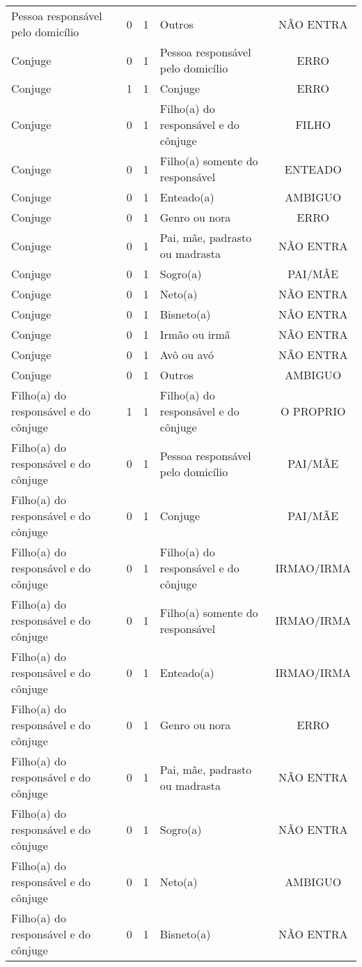 \documentclass[
	12pt,				%
	openright,			%
	twoside,			%
	a4paper,			%
	english,			%
	french,				%
	spanish,			%
	brazil				%
	]{abntex2}
\begin{document}
\begin{anexosenv}
\begin{longtable}{@{}lcclc@{}}
				Pessoa responsável pelo domicílio & 0 & 1 & Outros & NÃO ENTRA \\
				Conjuge & 0 & 1 & Pessoa responsável pelo domicílio & ERRO \\
				Conjuge & 1 & 1 & Conjuge & ERRO \\
				Conjuge & 0 & 1 & Filho(a) do responsável e do cônjuge & FILHO \\
				Conjuge & 0 & 1 & Filho(a) somente do responsável & ENTEADO \\
				Conjuge & 0 & 1 & Enteado(a) & AMBIGUO \\
				Conjuge & 0 & 1 & Genro ou nora & ERRO \\
				Conjuge & 0 & 1 & Pai, mãe, padrasto ou madrasta & NÃO ENTRA \\
				Conjuge & 0 & 1 & Sogro(a) & PAI/MÃE \\
				Conjuge & 0 & 1 & Neto(a) & NÃO ENTRA \\
				Conjuge & 0 & 1 & Bisneto(a) & NÃO ENTRA \\
				Conjuge & 0 & 1 & Irmão ou irmã & NÃO ENTRA \\
				Conjuge & 0 & 1 & Avô ou avó & NÃO ENTRA \\
				Conjuge & 0 & 1 & Outros & AMBIGUO \\
				Filho(a) do responsável e do cônjuge & 1 & 1 & Filho(a) do responsável e do cônjuge & O PROPRIO \\
				Filho(a) do responsável e do cônjuge & 0 & 1 & Pessoa responsável pelo domicílio & PAI/MÃE \\
				Filho(a) do responsável e do cônjuge & 0 & 1 & Conjuge & PAI/MÃE \\
				Filho(a) do responsável e do cônjuge & 0 & 1 & Filho(a) do responsável e do cônjuge & IRMAO/IRMA \\
				Filho(a) do responsável e do cônjuge & 0 & 1 & Filho(a) somente do responsável & IRMAO/IRMA \\
				Filho(a) do responsável e do cônjuge & 0 & 1 & Enteado(a) & IRMAO/IRMA \\
				Filho(a) do responsável e do cônjuge & 0 & 1 & Genro ou nora & ERRO \\
				Filho(a) do responsável e do cônjuge & 0 & 1 & Pai, mãe, padrasto ou madrasta & NÃO ENTRA \\
				Filho(a) do responsável e do cônjuge & 0 & 1 & Sogro(a) & NÃO ENTRA \\
				Filho(a) do responsável e do cônjuge & 0 & 1 & Neto(a) & AMBIGUO \\
				Filho(a) do responsável e do cônjuge & 0 & 1 & Bisneto(a) & NÃO ENTRA \\

\end{longtable}
\end{anexosenv}
\end{document}
